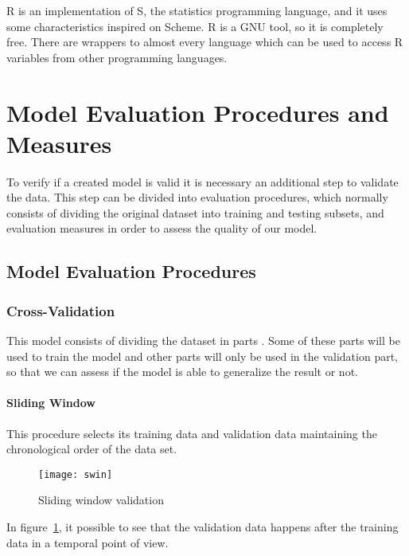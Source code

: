 R is an implementation of S, the statistics programming language, and it uses
some characteristics inspired on Scheme. R is a GNU tool, so it is completely
free. There are wrappers to almost every language which can be used to access R
variables from other programming languages.

\section{Model Evaluation Procedures and Measures}

To verify if a created model is valid it is necessary an additional step to
validate the data. This step can be divided into evaluation procedures, which
normally consists of dividing the original dataset into training and testing
subsets, and evaluation measures in order to assess the quality of our model.

\subsection{Model Evaluation Procedures} \subsubsection{Cross-Validation}

This model consists of dividing the dataset in parts
\cite{Witten:2005:DMP:1205860} . Some of these parts will be used to train the
model and other parts will only be used in the validation part, so that we can
assess if the model is able to generalize the result or not. 

\paragraph{Sliding Window}

This procedure selects its training data and validation data maintaining the
chronological order of the data set\cite{Bensch_self-learningprediction}.

\begin{figure}[!h] \begin{center} \leavevmode
\texttt{[image: swin]} \caption{Sliding window validation}
\label{fig:swin} \end{center} \end{figure} \FloatBarrier

In figure~\ref{fig:swin}, it possible to see that the validation data happens
after the training data in a temporal point of view.


